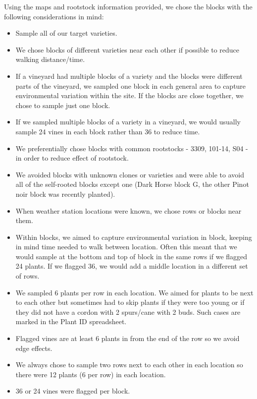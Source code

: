 \documentclass[11pt,letter]{article}
\newenvironment{smitemize}{
\begin{itemize}
  \setlength{\itemsep}{0pt}
  \setlength{\parskip}{0.8pt}
  \setlength{\parsep}{0pt}}
{\end{itemize}
}
\begin{document}
Using the maps and rootstock information provided, we chose the blocks with the following considerations in mind:
\begin{smitemize}
\item Sample all of our target varieties.
\item We chose blocks of different varieties near each other if possible to reduce walking distance/time. 
\item If a vineyard had multiple blocks of a variety and the blocks were different parts of the vineyard, we sampled one block in each general area to capture environmental variation within the site. If the blocks are close together, we chose to sample just one block.
\item If we sampled multiple blocks of a variety in a vineyard, we would usually sample 24 vines in each block rather than 36 to reduce time.
\item We preferentially chose blocks with common rootstocks - 3309, 101-14, S04 - in order to reduce effect of rootstock.
\item We avoided blocks with unknown clones or varieties and were able to avoid all of the self-rooted blocks except one (Dark Horse block G, the other Pinot noir block was recently planted).
\item When weather station locations were known, we chose rows or blocks near them.
\item Within blocks, we aimed to capture environmental variation in block, keeping in mind time needed to walk between location. Often this meant that we would sample at the bottom and top of block in the same rows if we flagged 24 plants. If we flagged 36, we would add a middle location in a different set of rows. 
\item We sampled 6 plants per row in each location. We aimed for plants to be next to each other but sometimes had to skip plants if they were too young or if they did not have a cordon with 2 spurs/cane with 2 buds. Such cases are marked in the Plant ID spreadsheet.
\item Flagged vines are at least 6 plants in from the end of the row so we avoid edge effects.
\item We always chose to sample two rows next to each other in each location so there were 12 plants (6 per row) in each location.
\item 36 or 24 vines were flagged per block.

\end{smitemize}
\end{document}
